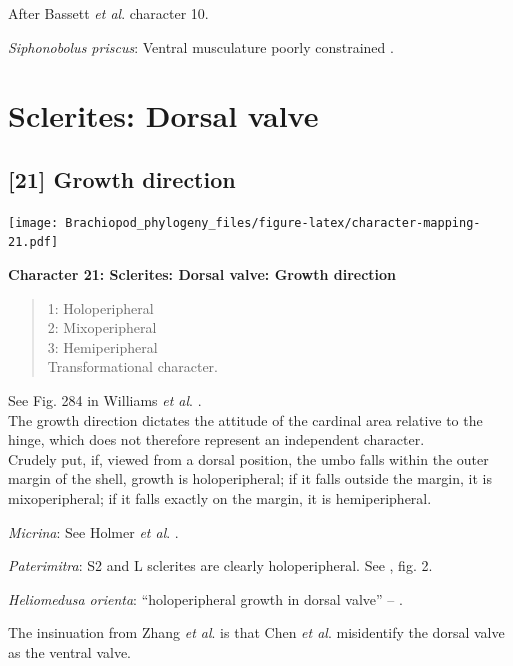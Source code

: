 \documentclass[]{book}
\theoremstyle{definition}
\theoremstyle{definition}
\theoremstyle{definition}
\theoremstyle{remark}
\begin{document}
After Bassett \emph{et al}.
\citeyearpar{Bassett2001Functionalmorphology} character 10.

\emph{Siphonobolus priscus}: Ventral musculature poorly constrained
\citep{Williams2000BrachiopodaLinguliformea, Popov2009Earlyontogeny}.

\hypertarget{sclerites-dorsal-valve}{%
\section{Sclerites: Dorsal valve}\label{sclerites-dorsal-valve}}

\hypertarget{growth-direction}{%
\subsection*{{[}21{]} Growth direction}\label{growth-direction}}

\texttt{[image: Brachiopod\_phylogeny\_files/figure-latex/character-mapping-21.pdf]}

\textbf{Character 21: Sclerites: Dorsal valve: Growth direction}

\begin{quote}
1: Holoperipheral\\
2: Mixoperipheral\\
3: Hemiperipheral\\
Transformational character.
\end{quote}

See Fig. 284 in Williams \emph{et al}.
\citeyearpar{Williams1997BrachiopodaRevised}.\\
The growth direction dictates the attitude of the cardinal area relative
to the hinge, which does not therefore represent an independent
character.\\
Crudely put, if, viewed from a dorsal position, the umbo falls within
the outer margin of the shell, growth is holoperipheral; if it falls
outside the margin, it is mixoperipheral; if it falls exactly on the
margin, it is hemiperipheral.

\emph{Micrina}: See Holmer \emph{et al}.
\citeyearpar{Holmer2008TheEarly}.

\emph{Paterimitra}: S2 and L sclerites are clearly holoperipheral. See
\citet{Larsson2014iPaterimitra}, fig. 2.

\emph{Heliomedusa orienta}: ``holoperipheral growth in dorsal valve'' --
\citet{Williams2007PartH}.

The insinuation from Zhang \emph{et al}.
\citeyearpar{Zhang2009Architectureand} is that Chen \emph{et al}.
\citeyearpar{Chen2007Reinterpretationof} misidentify the dorsal valve as
the ventral valve.
\end{document}
